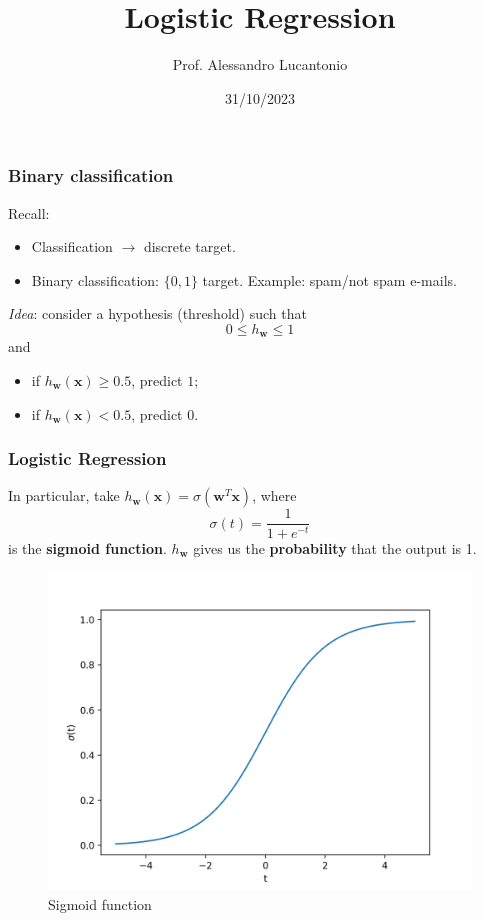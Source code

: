 \documentclass{beamer}
\title{Logistic Regression}
\author{Prof. Alessandro Lucantonio}
\institute{Aarhus University}
\date{31/10/2023}
\begin{document}
	\frame{\titlepage}
	
	\begin{frame}
		\frametitle{Binary classification}
		Recall: 
		\begin{itemize}
			\item Classification $\rightarrow$ discrete target.
			\item Binary classification: $\{0,1\}$ target. Example: spam/not spam e-mails.
		\end{itemize}
		
		\vspace{5mm}
		\textit{Idea}: consider a hypothesis (threshold) such that
		\begin{equation*}
			0 \leq h_{\bm{w}} \leq 1
		\end{equation*}
		and
		\begin{itemize}
			\item if $h_{\bm{w}}(\bm{x}) \geq 0.5$, predict $1$;
			\item if $h_{\bm{w}}(\bm{x}) < 0.5$, predict $0$.
		\end{itemize}
	\end{frame}

	\begin{frame}
		\frametitle{Logistic Regression}
		In particular, take $h_{\bm{w}}(\bm{x}) = \sigma(\bm{w}^T\bm{x})$, where
		\begin{equation*}
			\sigma(t) = \frac{1}{1+e^{-t}}
		\end{equation*}
		is the \textbf{sigmoid function}.
		$h_{\bm{w}}$ gives us the \textbf{probability} that the output is 1.
		\begin{figure}
			\centering
			\includegraphics[scale=0.42]{images/sigmoid}
			\caption{Sigmoid function}
		\end{figure}
		
	\end{frame}
\end{document}

